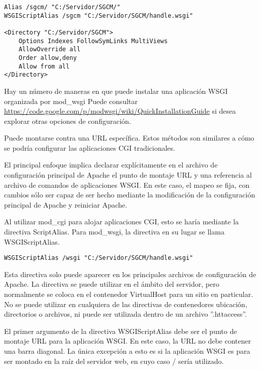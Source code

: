 \begin{lstlisting}[style=HTML]
Alias /sgcm/ "C:/Servidor/SGCM/" 
WSGIScriptAlias /sgcm "C:/Servidor/SGCM/handle.wsgi" 

<Directory "C:/Servidor/SGCM">
    Options Indexes FollowSymLinks MultiViews
    AllowOverride all
    Order allow,deny
    Allow from all
</Directory>
\end{lstlisting}
\vspace{0.1cm}


Hay un número de maneras en que puede instalar una aplicación WSGI organizada por mod\_wsgi
Puede consultar \url{https://code.google.com/p/modwsgi/wiki/QuickInstallationGuide} si desea explorar otras opciones de configuración.

Puede montarse contra una URL específica. Estos métodos son similares a cómo se podría configurar las aplicaciones CGI tradicionales.

El principal enfoque implica declarar explícitamente en el archivo de configuración principal de Apache el punto de montaje URL y una referencia al archivo de comandos de aplicaciones WSGI. En este caso, el mapeo se fija, con cambios sólo ser capaz de ser hecho mediante la modificación de la configuración principal de Apache y reiniciar Apache.

Al utilizar mod\_cgi para alojar aplicaciones CGI, esto se haría mediante la directiva ScriptAlias. Para mod\_wsgi, la directiva en su lugar se llama WSGIScriptAlias.

\begin{lstlisting}[style=consola]
WSGIScriptAlias /wsgi "C:/Servidor/SGCM/handle.wsgi" 
\end{lstlisting}
\vspace{0.1cm}

Esta directiva solo puede aparecer en los principales archivos de configuración de Apache. La directiva se puede utilizar en el ámbito del servidor, pero normalmente se coloca en el contenedor VirtualHost para un sitio en particular. No se puede utilizar en cualquiera de las directivas de contenedores ubicación, directorios o archivos, ni puede ser utilizada dentro de un archivo ''.httaccess''.

El primer argumento de la directiva WSGIScriptAlias debe ser el punto de montaje URL para la aplicación WSGI. En este caso, la URL no debe contener una barra diagonal. La única excepción a esto es si la aplicación WSGI es para ser montado en la raíz del servidor web, en cuyo caso / sería utilizado.


